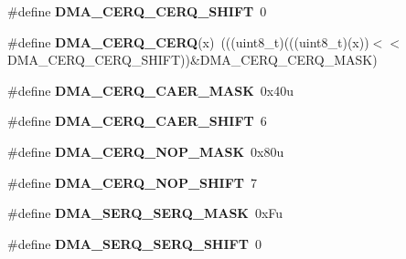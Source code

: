\begin{DoxyCompactItemize}
\item 
\#define {\bfseries D\+M\+A\+\_\+\+C\+E\+R\+Q\+\_\+\+C\+E\+R\+Q\+\_\+\+S\+H\+I\+FT}~0\hypertarget{group__DMA__Register__Masks_gaca402b011bea1924acca0e1e708c6db6}{}\label{group__DMA__Register__Masks_gaca402b011bea1924acca0e1e708c6db6}

\item 
\#define {\bfseries D\+M\+A\+\_\+\+C\+E\+R\+Q\+\_\+\+C\+E\+RQ}(x)~(((uint8\+\_\+t)(((uint8\+\_\+t)(x))$<$$<$D\+M\+A\+\_\+\+C\+E\+R\+Q\+\_\+\+C\+E\+R\+Q\+\_\+\+S\+H\+I\+FT))\&D\+M\+A\+\_\+\+C\+E\+R\+Q\+\_\+\+C\+E\+R\+Q\+\_\+\+M\+A\+SK)\hypertarget{group__DMA__Register__Masks_ga06bccf8bb52efa7918d7ba7648d30aa0}{}\label{group__DMA__Register__Masks_ga06bccf8bb52efa7918d7ba7648d30aa0}

\item 
\#define {\bfseries D\+M\+A\+\_\+\+C\+E\+R\+Q\+\_\+\+C\+A\+E\+R\+\_\+\+M\+A\+SK}~0x40u\hypertarget{group__DMA__Register__Masks_ga17f24999dd91f4ddc8f10ec2927da85b}{}\label{group__DMA__Register__Masks_ga17f24999dd91f4ddc8f10ec2927da85b}

\item 
\#define {\bfseries D\+M\+A\+\_\+\+C\+E\+R\+Q\+\_\+\+C\+A\+E\+R\+\_\+\+S\+H\+I\+FT}~6\hypertarget{group__DMA__Register__Masks_ga8a6482d87d17b4fec19e2fd984323f54}{}\label{group__DMA__Register__Masks_ga8a6482d87d17b4fec19e2fd984323f54}

\item 
\#define {\bfseries D\+M\+A\+\_\+\+C\+E\+R\+Q\+\_\+\+N\+O\+P\+\_\+\+M\+A\+SK}~0x80u\hypertarget{group__DMA__Register__Masks_gae8c0c81a0c9cfc2e2bd4aaa42ee5b204}{}\label{group__DMA__Register__Masks_gae8c0c81a0c9cfc2e2bd4aaa42ee5b204}

\item 
\#define {\bfseries D\+M\+A\+\_\+\+C\+E\+R\+Q\+\_\+\+N\+O\+P\+\_\+\+S\+H\+I\+FT}~7\hypertarget{group__DMA__Register__Masks_ga68bc3b3f8e1fe22186c0e92e73a93c64}{}\label{group__DMA__Register__Masks_ga68bc3b3f8e1fe22186c0e92e73a93c64}

\item 
\#define {\bfseries D\+M\+A\+\_\+\+S\+E\+R\+Q\+\_\+\+S\+E\+R\+Q\+\_\+\+M\+A\+SK}~0x\+Fu\hypertarget{group__DMA__Register__Masks_ga42b17276b88c86b34cabdbf64e4686c2}{}\label{group__DMA__Register__Masks_ga42b17276b88c86b34cabdbf64e4686c2}

\item 
\#define {\bfseries D\+M\+A\+\_\+\+S\+E\+R\+Q\+\_\+\+S\+E\+R\+Q\+\_\+\+S\+H\+I\+FT}~0\hypertarget{group__DMA__Register__Masks_ga41f7ac5f6e15267810208ea0146bdcad}{}\label{group__DMA__Register__Masks_ga41f7ac5f6e15267810208ea0146bdcad}


\end{DoxyCompactItemize}
